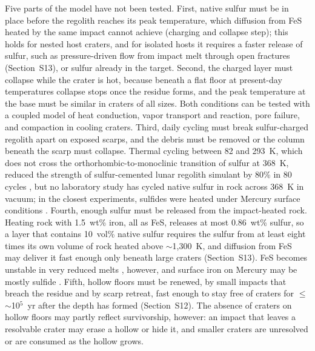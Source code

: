 \documentclass[article,review]{planetary}
\begin{document}
Five parts of the model have not been tested. First, native sulfur must be in place before the regolith reaches its peak temperature, which diffusion from FeS heated by the same impact cannot achieve (charging and collapse step); this holds for nested host craters, and for isolated hosts it requires a faster release of sulfur, such as pressure-driven flow from impact melt through open fractures (Section~S13), or sulfur already in the target. Second, the charged layer must collapse while the crater is hot, because beneath a flat floor at present-day temperatures collapse stops once the residue forms, and the peak temperature at the base must be similar in craters of all sizes. Both conditions can be tested with a coupled model of heat conduction, vapor transport and reaction, pore failure, and compaction in cooling craters. Third, daily cycling must break sulfur-charged regolith apart on exposed scarps, and the debris must be removed or the column beneath the scarp must collapse. Thermal cycling between 82 and 293~K, which does not cross the orthorhombic-to-monoclinic transition of sulfur at 368~K, reduced the strength of sulfur-cemented lunar regolith simulant by 80\% in 80 cycles \parencite{grugel2008}, but no laboratory study has cycled native sulfur in rock across 368~K in vacuum; in the closest experiments, sulfides were heated under Mercury surface conditions \parencite{helbert2013,varatharajan2019,barbaro2023}. Fourth, enough sulfur must be released from the impact-heated rock. Heating rock with 1.5~wt\% iron, all as FeS, releases at most 0.86~wt\% sulfur, so a layer that contains 10~vol\% native sulfur requires the sulfur from at least eight times its own volume of rock heated above $\sim$1,300~K, and diffusion from FeS may deliver it fast enough only beneath large craters (Section~S13). FeS becomes unstable in very reduced melts \parencite{anzures2020}, however, and surface iron on Mercury may be mostly sulfide \parencite{weider2014,renggli2026}. Fifth, hollow floors must be renewed, by small impacts that breach the residue and by scarp retreat, fast enough to stay free of craters for $\leq$ $\sim$10$^5$~yr after the depth has formed (Section~S12). The absence of craters on hollow floors may partly reflect survivorship, however: an impact that leaves a resolvable crater may erase a hollow or hide it, and smaller craters are unresolved or are consumed as the hollow grows.
\end{document}
